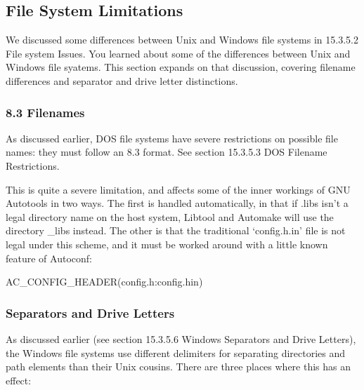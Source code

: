 \subsection{File System Limitations}

We discussed some differences between Unix and Windows file systems in 15.3.5.2 File system Issues. You learned about some of the differences between Unix and Windows file syatems. This section expands on that discussion, covering filename differences and separator and drive letter distinctions. 

\subsubsection{8.3 Filenames}

As discussed earlier, DOS file systems have severe restrictions on possible file names: they must follow an 8.3 format. See section 15.3.5.3 DOS Filename Restrictions.

This is quite a severe limitation, and affects some of the inner workings of GNU Autotools in two ways. The first is handled automatically, in that if .libs isn't a legal directory name on the host system, Libtool and Automake will use the directory \_{}libs instead. The other is that the traditional `config.h.in' file is not legal under this scheme, and it must be worked around with a little known feature of Autoconf:

 	

AC\_{}CONFIG\_{}HEADER(config.h:config.hin)


\subsubsection{Separators and Drive Letters}

As discussed earlier (see section 15.3.5.6 Windows Separators and Drive Letters), the Windows file systems use different delimiters for separating directories and path elements than their Unix cousins. There are three places where this has an effect: 


